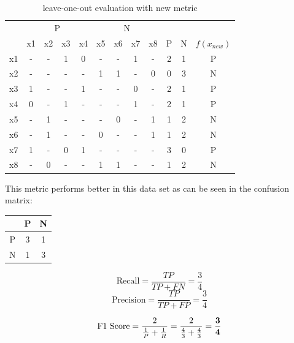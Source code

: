 \documentclass{article}
\begin{document}
\begin{enumerate}[leftmargin=\labelsep]
\begin{table}[H]
  \centering
  \begin{tabular}{c|cccc|cccc|ccc}
    \multicolumn{1}{c}{} & \multicolumn{4}{c}{P} & \multicolumn{4}{c}{N}  \\
      & x1 & x2 & x3 & x4 & x5 & x6 & x7 & x8 & P & N & $f(x_{new})$ \\ \hline
  x1  & -  & -  & 1  & 0  & -  & -  & 1  & -  & 2 & 1 & P \\
  x2  & -  & -  & -  & -  & 1  & 1  & -  & 0  & 0 & 3 & N \\
  x3  & 1  & -  & -  & 1  & -  & -  & 0  & -  & 2 & 1 & P \\
  x4  & 0  & -  & 1  & -  & -  & -  & 1  & -  & 2 & 1 & P \\
  x5  & -  & 1  & -  & -  & -  & 0  & -  & 1  & 1 & 2 & N \\
  x6  & -  & 1  & -  & -  & 0  & -  & -  & 1  & 1 & 2 & N \\
  x7  & 1  & -  & 0  & 1  & -  & -  & -  & -  & 3 & 0 & P \\
  x8  & -  & 0  & -  & -  & 1  & 1  & -  & -  & 1 & 2 & N \\ \hline
  \end{tabular}
  \caption{leave-one-out evaluation with new metric}
\end{table}

This metric performs better in this data set 
as can be seen in the confusion matrix:

\begin{table}[H]
  \centering
  \begin{tabular}{@{}ccc}
    & P & N \\ \midrule 
    P & 3 & 1 \\
    N & 1 & 3 \\
  \end{tabular}
\end{table}

\begin{equation*}
  \text{Recall} = \frac{TP}{TP + FN} = \frac{3}{4}
\end{equation*}
\begin{equation*}
  \text{Precision} = \frac{TP}{TP + FP} = \frac{3}{4}
\end{equation*}

\begin{equation*}
  \text{F1 Score} = \frac{2}{\frac{1}{P}+\frac{1}{R}} = \frac{2}{\frac{4}{3}+\frac{4}{3}} = \frac{\textbf3}{\textbf4}
\end{equation*}


\end{enumerate}
\end{document}
